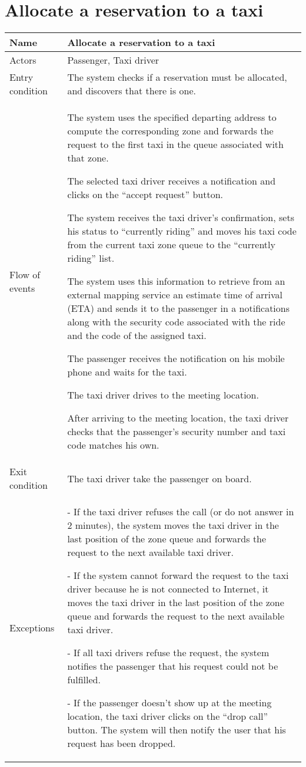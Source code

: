 \section{Allocate a reservation to a taxi}
\begin{center}
\begin{longtable}{|l| p{9cm}|}
\hline
Name &
Allocate a reservation to a taxi \\
\hline
Actors &
Passenger, Taxi driver \\
\hline
Entry condition & 
The system checks if a reservation must be allocated, and discovers that there is one. \\
\hline
Flow of events & 
The system uses the specified departing address to compute the corresponding zone and forwards the request to the first taxi in the queue associated with that zone.

The selected taxi driver receives a notification
and clicks on the ``accept request'' button.

The system receives the taxi driver's confirmation, sets his status to ``currently riding'' and moves his taxi code from the current taxi zone queue to the ``currently riding'' list.

The system uses this information to retrieve from an external mapping service an estimate time of arrival (ETA) and sends it to the passenger in a notifications along with the security code associated with the ride and the code of the assigned taxi.

The passenger receives the notification on his mobile phone and waits for the taxi.

The taxi driver drives to the meeting location.

After arriving to the meeting location, the taxi driver checks that the passenger's security number and taxi code matches his own. \\
\hline
Exit condition &
The taxi driver take the passenger on board. \\
\hline
Exceptions &
- If the taxi driver refuses the call (or do not answer in 2 minutes), the system moves the taxi driver in the last position of the zone queue and forwards the request to the next available taxi driver.

- If the system cannot forward the request to the taxi driver because he is not connected to Internet, it moves the taxi driver in the last position of the zone queue and forwards the request to the next available taxi driver.

- If all taxi drivers refuse the request, the system notifies the passenger that his request could not be fulfilled.

- If the passenger doesn't show up at the meeting location, the taxi driver clicks on the ``drop call'' button. The system will then notify the user that his request has been dropped. \\
\hline
\end{longtable}
\end{center}


